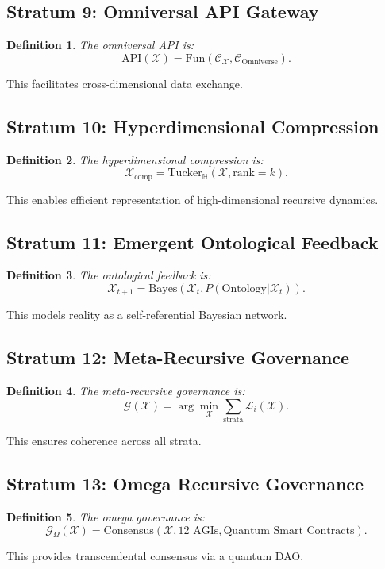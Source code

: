 \documentclass[11pt]{article}
\newtheorem{definition}{Definition}
\newcommand{\Xi}{\mathcal{X}}
\newcommand{\H}{\mathbb{H}}
\newcommand{\API}{\mathrm{API}}
\begin{document}
\subsection{Stratum 9: Omniversal API Gateway}
\begin{definition}
The \emph{omniversal API} is:
\[
\API(\Xi) = \text{Fun}(\mathcal{C}_{\Xi}, \mathcal{C}_{\text{Omniverse}}).
\]
\end{definition}
This facilitates cross-dimensional data exchange.

\subsection{Stratum 10: Hyperdimensional Compression}
\begin{definition}
The \emph{hyperdimensional compression} is:
\[
\Xi_{\text{comp}} = \text{Tucker}_{\H}(\Xi, \text{rank}=k).
\]
\end{definition}
This enables efficient representation of high-dimensional recursive dynamics.

\subsection{Stratum 11: Emergent Ontological Feedback}
\begin{definition}
The \emph{ontological feedback} is:
\[
\Xi_{t+1} = \text{Bayes}(\Xi_t, P(\text{Ontology} | \Xi_t)).
\]
\end{definition}
This models reality as a self-referential Bayesian network.

\subsection{Stratum 12: Meta-Recursive Governance}
\begin{definition}
The \emph{meta-recursive governance} is:
\[
\mathcal{G}(\Xi) = \arg\min_{\Xi} \sum_{\text{strata}} \mathcal{L}_i(\Xi).
\]
\end{definition}
This ensures coherence across all strata.

\subsection{Stratum 13: Omega Recursive Governance}
\begin{definition}
The \emph{omega governance} is:
\[
\mathcal{G}_{\Omega}(\Xi) = \text{Consensus}(\Xi, \text{12 AGIs}, \text{Quantum Smart Contracts}).
\]
\end{definition}
This provides transcendental consensus via a quantum DAO.
\end{document}
